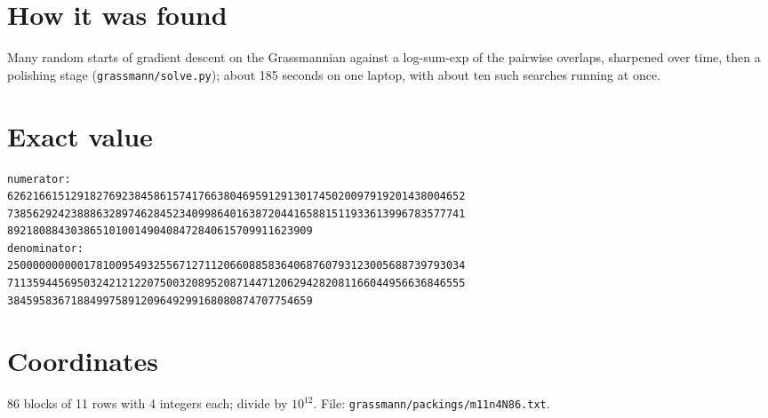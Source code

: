\documentclass[11pt,a4paper]{article}
\begin{document}
\section{How it was found}
Many random starts of gradient descent on the Grassmannian against a log-sum-exp of the pairwise overlaps, sharpened over time, then a polishing stage (\texttt{grassmann/solve.py}); about 185 seconds on one laptop, with about ten such searches running at once.


\appendix
\section{Exact value}
{\small
\begin{verbatim}
numerator:
626216615129182769238458615741766380469591291301745020097919201438004652
738562924238886328974628452340998640163872044165881511933613996783577741
892180884303865101001490408472840615709911623909
denominator:
250000000000178100954932556712711206608858364068760793123005688739793034
711359445695032421212207500320895208714471206294282081166044956636846555
384595836718849975891209649299168080874707754659
\end{verbatim}}

\section{Coordinates}
86 blocks of 11 rows with 4 integers each; divide by $10^{12}$. File: \texttt{grassmann/packings/m11n4N86.txt}.
{\tiny
\begin{multicols}{3}
\end{multicols}}
\end{document}
